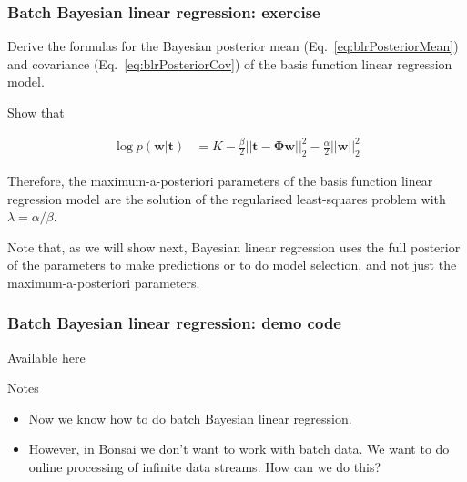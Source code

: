 \begin{frame}
    \frametitle{Batch Bayesian linear regression: exercise}

    \scriptsize
    \begin{probExercise}
		Derive the formulas for the Bayesian posterior mean
(Eq.~\ref{eq:blrPosteriorMean}) and covariance (Eq.~\ref{eq:blrPosteriorCov})
of the basis function linear regression model.
    \end{probExercise}

    \begin{probExercise}
        Show that

        \begin{align}
            \log p(\mathbf{w}|\boldsymbol{t})&=K-\frac{\beta}{2}||\mathbf{t}-\boldsymbol{\Phi}\mathbf{w}||_2^2-\frac{\alpha}{2}||\mathbf{w}||_2^2
        \end{align}

        Therefore, the maximum-a-posteriori parameters of the basis function
        linear regression model are the solution of the regularised
        least-squares problem with $\lambda=\alpha/\beta$.

        Note that, as we will show next, Bayesian linear regression uses the
        full posterior of the parameters to make predictions or to do model
        selection, and not just the maximum-a-posteriori parameters.

    \end{probExercise}
    \normalsize

\end{frame}

\begin{frame}
    \frametitle{Batch Bayesian linear regression: demo code}
    Available \href{https://joacorapela.github.io/gcnuBridging2023/auto\_examples/bayesianLinearRegression/plotBatchBayesianLinearRegression.html\#sphx-glr-auto-examples-bayesianlinearregression-plotbatchbayesianlinearregression-py}{here}
\end{frame}

\begin{frame}

\begin{alertblock}{Notes}
    \begin{itemize}
        \item Now we know how to do batch Bayesian linear regression.
        \item However, in Bonsai we don't want to work with batch data. We want
            to do online processing of infinite data streams. How can we do
            this?
    \end{itemize}
\end{alertblock}

\end{frame}

